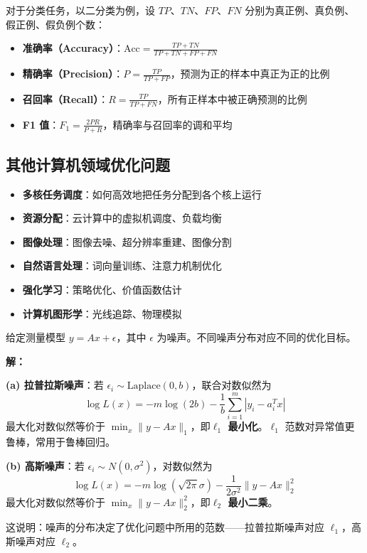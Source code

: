 \begin{conceptbox}[分类问题的评价指标]
对于分类任务，以二分类为例，设 $TP$、$TN$、$FP$、$FN$ 分别为真正例、真负例、假正例、假负例个数：
\begin{itemize}[itemsep=0.3em]
    \item \textbf{准确率（Accuracy）}：$\displaystyle\text{Acc} = \frac{TP + TN}{TP + TN + FP + FN}$
    \item \textbf{精确率（Precision）}：$\displaystyle P = \frac{TP}{TP + FP}$，预测为正的样本中真正为正的比例
    \item \textbf{召回率（Recall）}：$\displaystyle R = \frac{TP}{TP + FN}$，所有正样本中被正确预测的比例
    \item \textbf{F1 值}：$\displaystyle F_1 = \frac{2PR}{P + R}$，精确率与召回率的调和平均
\end{itemize}
\end{conceptbox}

\subsection{其他计算机领域优化问题}

\begin{conceptbox}[典型优化问题]
\begin{itemize}[itemsep=0.3em]
    \item \textbf{多核任务调度}：如何高效地把任务分配到各个核上运行
    \item \textbf{资源分配}：云计算中的虚拟机调度、负载均衡
    \item \textbf{图像处理}：图像去噪、超分辨率重建、图像分割
    \item \textbf{自然语言处理}：词向量训练、注意力机制优化
    \item \textbf{强化学习}：策略优化、价值函数估计
    \item \textbf{计算机图形学}：光线追踪、物理模拟
\end{itemize}
\end{conceptbox}

\begin{example}[噪声模型与极大似然估计]\label{ex:mle-noise}
给定测量模型 $y = Ax + \epsilon$，其中 $\epsilon$ 为噪声。不同噪声分布对应不同的优化目标。

\textbf{解：}

\textbf{(a) 拉普拉斯噪声}：若 $\epsilon_i \sim \text{Laplace}(0, b)$，联合对数似然为
\[
\log L(x) = -m \log(2b) - \frac{1}{b}\sum_{i=1}^m |y_i - a_i^T x|
\]
最大化对数似然等价于 $\min_x \|y - Ax\|_1$，即\textbf{$\ell_1$ 最小化}。$\ell_1$ 范数对异常值更鲁棒，常用于鲁棒回归。

\textbf{(b) 高斯噪声}：若 $\epsilon_i \sim N(0, \sigma^2)$，对数似然为
\[
\log L(x) = -m \log(\sqrt{2\pi}\sigma) - \frac{1}{2\sigma^2}\|y - Ax\|_2^2
\]
最大化对数似然等价于 $\min_x \|y - Ax\|_2^2$，即\textbf{$\ell_2$ 最小二乘}。

这说明：噪声的分布决定了优化问题中所用的范数——拉普拉斯噪声对应 $\ell_1$，高斯噪声对应 $\ell_2$。
\end{example}

